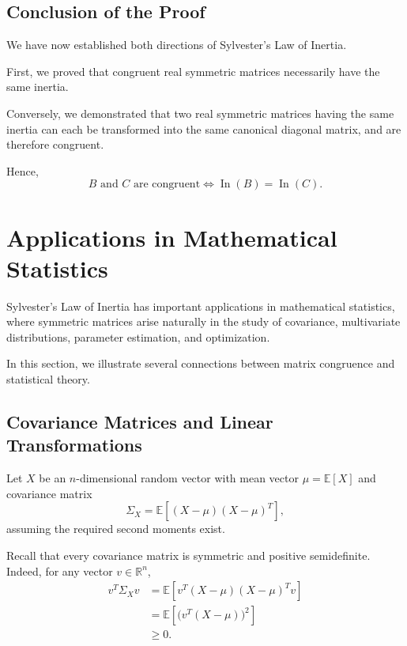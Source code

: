 \documentclass[11pt]{article}
\theoremstyle{definition}
\theoremstyle{remark}
\begin{document}

\subsection{Conclusion of the Proof}

We have now established both directions
of Sylvester's Law of Inertia.

First, we proved that congruent real
symmetric matrices necessarily have
the same inertia.

Conversely, we demonstrated that two
real symmetric matrices having the same
inertia can each be transformed into
the same canonical diagonal matrix,
and are therefore congruent.

Hence,
\[
    \boxed{
    B\text{ and }C\text{ are congruent}
    \iff
    \operatorname{In}(B)=\operatorname{In}(C).
    }
\]


\section{Applications in Mathematical Statistics}

Sylvester's Law of Inertia has important applications
in mathematical statistics, where symmetric matrices
arise naturally in the study of covariance,
multivariate distributions, parameter estimation,
and optimization.

In this section, we illustrate several connections
between matrix congruence and statistical theory.

\subsection{Covariance Matrices and Linear Transformations}

Let $X$ be an $n$-dimensional random vector with
mean vector $\mu=\mathbb{E}[X]$ and covariance matrix
\[
    \Sigma_X
    =\mathbb{E}\left[
    (X-\mu)(X-\mu)^T
    \right],
\]
assuming the required second moments exist.

Recall that every covariance matrix is symmetric
and positive semidefinite. Indeed, for any vector
$v\in\mathbb{R}^n$,
\[
\begin{aligned}
    v^T\Sigma_Xv
    &=\mathbb{E}\left[
      v^T(X-\mu)(X-\mu)^Tv
      \right]\\
    &=\mathbb{E}\left[
      \bigl(v^T(X-\mu)\bigr)^2
      \right]\\
    &\geq 0.
\end{aligned}
\]
\end{document}
